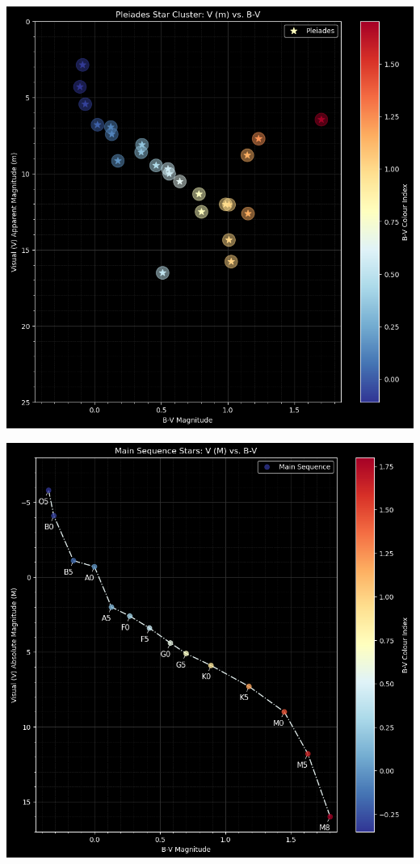 \documentclass[12pt]{article}
\begin{document}
\begin{minipage}{.49\textwidth}
    \captionsetup{hypcap=false}
    \centering
    \includegraphics[width=\linewidth]{pleiades graoh.png}
    \label{fig:pleigraph}
\end{minipage}
\hfill
\begin{minipage}{.5\textwidth}
    \captionsetup{hypcap=false}
    \centering
    \includegraphics[width=\linewidth]{ms graph.png}
    \label{fig:msgraph}
\end{minipage}
\end{document}
